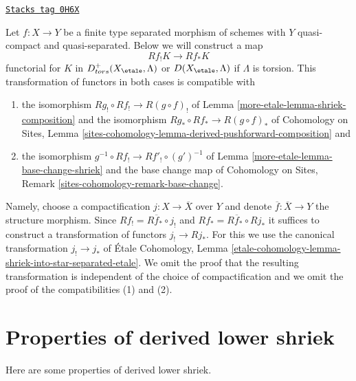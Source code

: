 \begin{remark}
\label{more-etale-remark-shriek-to-star}
\href{https://stacks.math.columbia.edu/tag/0H6X}{\texttt{Stacks tag 0H6X}}

Let $f : X \to Y$ be a finite type separated morphism of schemes
with $Y$ quasi-compact and quasi-separated. Below we will construct
a map
$$
Rf_!K \longrightarrow Rf_*K
$$
functorial for $K$ in $D^+_{tors}(X_\etale, \Lambda)$ or
$D(X_\etale, \Lambda)$ if $\Lambda$ is torsion. This transformation
of functors in both cases is compatible with
\begin{enumerate}
\item the isomorphism $Rg_! \circ Rf_! \to R(g \circ f)_!$ of
Lemma \ref{more-etale-lemma-shriek-composition} and the isomorphism
$Rg_* \circ Rf_* \to R(g \circ f)_*$ of
Cohomology on Sites, Lemma
\ref{sites-cohomology-lemma-derived-pushforward-composition} and
\item the isomorphism $g^{-1} \circ Rf_! \to Rf'_! \circ (g')^{-1}$
of Lemma \ref{more-etale-lemma-base-change-shriek}
and the base change map of
Cohomology on Sites, Remark \ref{sites-cohomology-remark-base-change}.
\end{enumerate}
Namely, choose a compactification $j : X \to \overline{X}$ over $Y$
and denote $\overline{f} : \overline{X} \to Y$ the structure morphism.
Since $Rf_! = R\overline{f}_* \circ j_!$ and
$Rf_* = R\overline{f}_* \circ Rj_*$ it suffices to construct a
transformation of functors $j_! \to Rj_*$. For this we use the
canonical transformation $j_! \to j_*$ of
\'Etale Cohomology, Lemma
\ref{etale-cohomology-lemma-shriek-into-star-separated-etale}.
We omit the proof that the resulting transformation is independent
of the choice of compactification and we omit the proof of the
compatibilities (1) and (2).
\end{remark}

\section{Properties of derived lower shriek}
\label{more-etale-section-derived-lower-shriek-properties}
Here are some properties of derived lower shriek.

